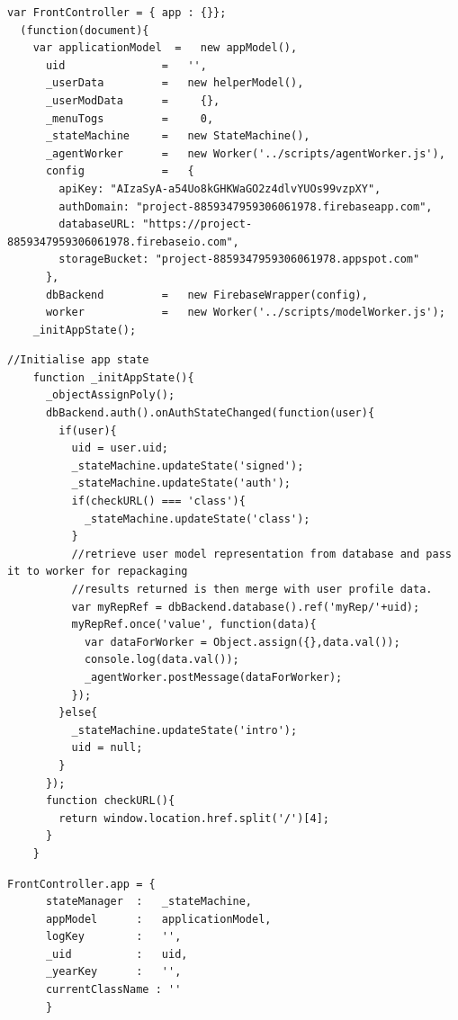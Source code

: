 \begin{lstlisting}[caption={Initiating frontcontroller and creating an instance of Firebase}, label={lst:FirebaseConfig}]
var FrontController = { app : {}};
  (function(document){
    var applicationModel  =   new appModel(),
      uid               =   '',
      _userData         =   new helperModel(),
      _userModData      =     {},
      _menuTogs         =     0,
      _stateMachine     =   new StateMachine(),
      _agentWorker      =   new Worker('../scripts/agentWorker.js'),
      config            =   {
        apiKey: "AIzaSyA-a54Uo8kGHKWaGO2z4dlvYUOs99vzpXY",
        authDomain: "project-8859347959306061978.firebaseapp.com",
        databaseURL: "https://project-8859347959306061978.firebaseio.com",
        storageBucket: "project-8859347959306061978.appspot.com"
      },
      dbBackend         =   new FirebaseWrapper(config),
      worker            =   new Worker('../scripts/modelWorker.js');
    _initAppState();
\end{lstlisting}


\begin{lstlisting}[caption={Initiating the application state from the front controller}, label={lst:InitAppState}]
    //Initialise app state
    function _initAppState(){
      _objectAssignPoly();
      dbBackend.auth().onAuthStateChanged(function(user){
        if(user){
          uid = user.uid;
          _stateMachine.updateState('signed');
          _stateMachine.updateState('auth');
          if(checkURL() === 'class'){
            _stateMachine.updateState('class');
          }
          //retrieve user model representation from database and pass it to worker for repackaging
          //results returned is then merge with user profile data.
          var myRepRef = dbBackend.database().ref('myRep/'+uid);
          myRepRef.once('value', function(data){
            var dataForWorker = Object.assign({},data.val());
            console.log(data.val());
            _agentWorker.postMessage(dataForWorker);
          });
        }else{
          _stateMachine.updateState('intro');
          uid = null;
        }
      });
      function checkURL(){
        return window.location.href.split('/')[4];
      }
    }
\end{lstlisting}


\begin{lstlisting}[caption={Frontcontroller app model}, label={lst:FrontControllerAppModel}]
    FrontController.app = {
      stateManager  :   _stateMachine,
      appModel      :   applicationModel,
      logKey        :   '',
      _uid          :   uid,
      _yearKey      :   '',
      currentClassName : ''
      }
\end{lstlisting}

